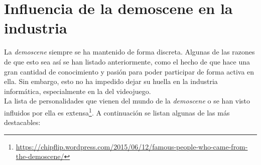 
\section{Influencia de la demoscene en la industria}

La \emph{demoscene} siempre se ha mantenido de forma discreta. Algunas de las razones de que esto sea así se han listado anteriormente, como el hecho de que hace una gran cantidad de conocimiento y pasión para poder participar de forma activa en ella. Sin embargo, esto no ha impedido dejar su huella en la industria informática, especialmente en la del videojuego.\\

La lista de personalidades que vienen del mundo de la \emph{demoscene} o se han visto influidos por ella es extensa\footnote{\url{https://chipflip.wordpress.com/2015/06/12/famous-people-who-came-from-the-demoscene/}}. A continuación se listan algunas de las más destacables:

